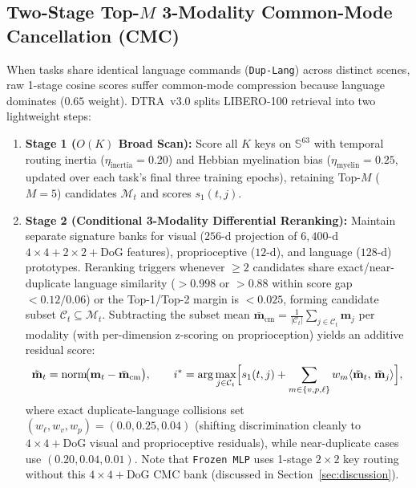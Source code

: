 \documentclass[10pt]{article}
\begin{document}
\subsection{Two-Stage Top-\texorpdfstring{$M$}{M} 3-Modality Common-Mode Cancellation (CMC)}
When tasks share identical language commands (\texttt{Dup-Lang}) across distinct scenes, raw 1-stage cosine scores suffer common-mode compression because language dominates ($0.65$ weight). DTRA~v3.0 splits LIBERO-100 retrieval into two lightweight steps:
\begin{enumerate}[leftmargin=*,itemsep=1.5pt]
  \item \textbf{Stage 1 ($O(K)$ Broad Scan):} Score all $K$ keys on $\mathbb{S}^{63}$ with temporal routing inertia ($\eta_{\text{inertia}}=0.20$) and Hebbian myelination bias ($\eta_{\text{myelin}}=0.25$, updated over each task's final three training epochs), retaining Top-$M$ ($M=5$) candidates $\mathcal{M}_t$ and scores $s_1(t, j)$.
  \item \textbf{Stage 2 (Conditional 3-Modality Differential Reranking):} Maintain separate signature banks for visual ($256$-d projection of $6{,}400$-d $4\times 4+2\times 2+\text{DoG}$ features), proprioceptive ($12$-d), and language ($128$-d) prototypes. Reranking triggers whenever $\ge 2$ candidates share exact/near-duplicate language similarity ($>0.998$ or $>0.88$ within score gap $<0.12/0.06$) or the Top-1/Top-2 margin is $<0.025$, forming candidate subset $\mathcal{C}_t \subseteq \mathcal{M}_t$. Subtracting the subset mean $\bar{\mathbf{m}}_{\text{cm}} = \frac{1}{|\mathcal{C}_t|}\sum_{j \in \mathcal{C}_t} \mathbf{m}_j$ per modality (with per-dimension z-scoring on proprioception) yields an additive residual score:
  \begin{equation}
    \tilde{\mathbf{m}}_t = \mathrm{norm}\!\bigl(\mathbf{m}_t - \bar{\mathbf{m}}_{\text{cm}}\bigr), \qquad
    i^* = \arg\max_{j \in \mathcal{C}_t} \Bigl[ s_1(t, j) + \sum_{m \in \{v,p,\ell\}} w_m \langle \tilde{\mathbf{m}}_t,\, \tilde{\mathbf{m}}_j \rangle \Bigr],
  \end{equation}
  where exact duplicate-language collisions set $(w_\ell, w_v, w_p) = (0.0, 0.25, 0.04)$ (shifting discrimination cleanly to $4\times 4+\text{DoG}$ visual and proprioceptive residuals), while near-duplicate cases use $(0.20, 0.04, 0.01)$. Note that \texttt{Frozen MLP} uses 1-stage $2\times 2$ key routing without this $4\times 4+\text{DoG}$ CMC bank (discussed in Section~\ref{sec:discussion}).
\end{enumerate}
\end{document}
